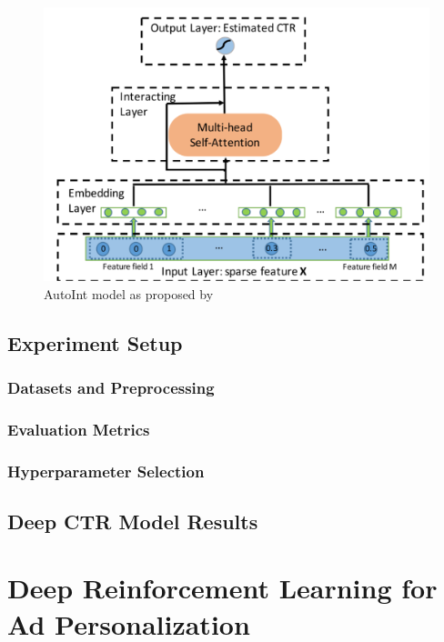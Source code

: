 \documentclass{mldsmsc}
\begin{document}
\begin{figure}[h]
\centering
\includegraphics[width=\textwidth]{../figures/autoint.png}
\caption{AutoInt model as proposed by \cite{RefWorks:song2019autoint}}
\label{fig:autoint}
\end{figure}

\section{Experiment Setup}

\subsection{Datasets and Preprocessing}

\subsection{Evaluation Metrics}

\subsection{Hyperparameter Selection}

\section{Deep CTR Model Results}

\chapter{Deep Reinforcement Learning for Ad Personalization}
\label{chap:deep-rl-for-ad-personalization}
\end{document}
